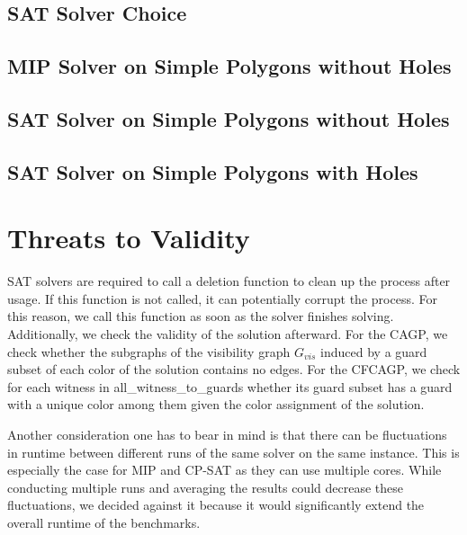 \subsection{SAT Solver Choice}



\subsection{MIP Solver on Simple Polygons without Holes}

\subsection{SAT Solver on Simple Polygons without Holes}

\subsection{SAT Solver on Simple Polygons with Holes}

\section{Threats to Validity}
SAT solvers are required to call a deletion function to clean up the process after usage. If this function is not called, it can potentially corrupt the process. For this reason, we call this function as soon as the solver finishes solving. Additionally, we check the validity of the solution afterward. For the CAGP, we check whether the subgraphs of the visibility graph $G_{vis}$ induced by a guard subset of each color of the solution contains no edges. For the CFCAGP, we check for each witness in all\_witness\_to\_guards whether its guard subset has a guard with a unique color among them given the color assignment of the solution.

Another consideration one has to bear in mind is that there can be fluctuations in runtime between different runs of the same solver on the same instance. This is especially the case for MIP and CP-SAT as they can use multiple cores. While conducting multiple runs and averaging the results could decrease these fluctuations, we decided against it because it would significantly extend the overall runtime of the benchmarks.